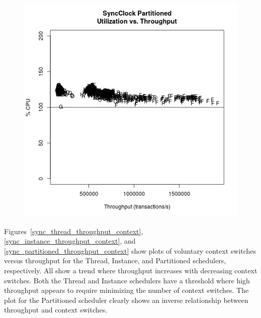 \begin{figure}
\center
\includegraphics[height=.4\textheight]{sync_partitioned_throughput_utilization.png}
\caption{\label{sync_partitioned_throughput_utilization}}
\end{figure}

Figures~\ref{sync_thread_throughput_context}, \ref{sync_instance_throughput_context}, and \ref{sync_partitioned_throughput_context} show plots of voluntary context switches versus throughput for the Thread, Instance, and Partitioned schedulers, respectively.
All show a trend where throughput increases with decreasing context switches.
Both the Thread and Instance schedulers have a threshold where high throughput appears to require minimizing the number of context switches.
The plot for the Partitioned scheduler clearly shows an inverse relationship between throughput and context switches.

